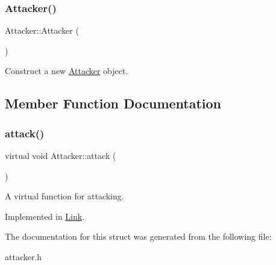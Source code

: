 \subsubsection{\texorpdfstring{Attacker()}{Attacker()}}
{\footnotesize\ttfamily Attacker\+::\+Attacker (\begin{DoxyParamCaption}{ }\end{DoxyParamCaption})\hspace{0.3cm}{\ttfamily [inline]}}



Construct a new \mbox{\hyperlink{structAttacker}{Attacker}} object. 



\subsection{Member Function Documentation}
\mbox{\label{structAttacker_a4ce0aa08a102bd688d9a47322a830173}} 
\subsubsection{\texorpdfstring{attack()}{attack()}}
{\footnotesize\ttfamily virtual void Attacker\+::attack (\begin{DoxyParamCaption}{ }\end{DoxyParamCaption})\hspace{0.3cm}{\ttfamily [pure virtual]}}



A virtual function for attacking. 



Implemented in \mbox{\hyperlink{classLink_a0d56dc31b6bf76258f50a393e92f46c4}{Link}}.



The documentation for this struct was generated from the following file\+:\begin{DoxyCompactItemize}
\item 
attacker.\+h\end{DoxyCompactItemize}
